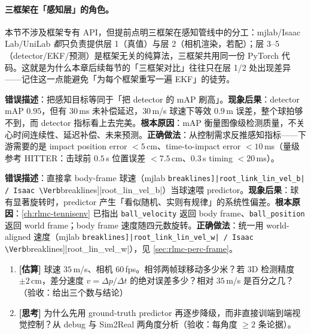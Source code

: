 \paragraph{三框架在「感知层」的角色。}本节不涉及框架专有 API，但提前点明三框架在感知管线中的分工：mjlab/Isaac Lab/UniLab \emph{都}只负责提供层 1（真值）与层 2（相机渲染，若配）；层 3--5（detector/EKF/预测）是框架无关的纯算法，三框架共用同一份 PyTorch 代码。这就是为什么本章后续每节的「三框架对比」往往只在层 1/2 处出现差异——记住这一点能避免「为每个框架重写一遍 EKF」的徒劳。

\begin{pitfall}
\textbf{错误描述}：把感知目标等同于「把 detector 的 mAP 刷高」。\textbf{现象后果}：detector mAP $0.95$，但有 $30$\,ms 未补偿延迟，$30$\,m/s 球速下等效 $0.9$\,m 误差，整个球拍够不到，而 detector 指标看上去完美。\textbf{根本原因}：mAP 衡量图像级检测质量，不关心时间连续性、延迟补偿、未来预测。\textbf{正确做法}：从控制需求反推感知指标——下游需要的是 impact position error $<5$\,cm、time-to-impact error $<10$\,ms（量级参考 HITTER：击球前 $0.5$\,s 位置误差 $<7.5$\,cm、$0.3$\,s timing $<20$\,ms\cite{tennis_hitter2025}）。
\end{pitfall}

\begin{pitfall}
\textbf{错误描述}：直接拿 body-frame 球速（mjlab \Verb[breaklines]|root_link_lin_vel_b| / Isaac \Verb[breaklines]|root_lin_vel_b|）当球速喂 predictor。\textbf{现象后果}：球有显著旋转时，predictor 产生「看似随机、实则有规律」的系统性偏差。\textbf{根本原因}：\cref{ch:rlmc-tennisenv} 已指出 \verb|ball_velocity| 返回 body frame、\verb|ball_position| 返回 world frame；body frame 速度随四元数旋转。\textbf{正确做法}：统一用 world-aligned 速度（mjlab \Verb[breaklines]|root_link_lin_vel_w| / Isaac \Verb[breaklines]|root_lin_vel_w|），见 \cref{sec:rlmc-perc-frame}。
\end{pitfall}

\begin{practice}[本节动手任务]
\begin{enumerate}
  \item \textbf{[估算]} 球速 $35$\,m/s、相机 $60$\,fps。相邻两帧球移动多少米？若 3D 检测精度 $\pm 2$\,cm，差分速度 $v=\Delta p/\Delta t$ 的绝对误差多少？相对 $35$\,m/s 是百分之几？（验收：给出三个数与结论）
  \item \textbf{[思考]} 为什么先用 ground-truth predictor 再逐步降级，而非直接训端到端视觉控制？从 debug 与 Sim2Real 两角度分析（验收：每角度 $\ge 2$ 条论据）。
\end{enumerate}
\end{practice}


